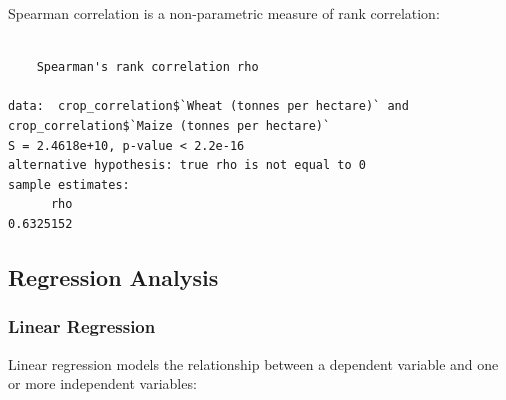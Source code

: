 \documentclass[
  letterpaper,
]{book}
\newenvironment{Shaded}{\begin{snugshade}}{\end{snugshade}}
\newcommand{\AttributeTok}[1]{\textcolor[rgb]{0.40,0.45,0.13}{#1}}
\newcommand{\CommentTok}[1]{\textcolor[rgb]{0.37,0.37,0.37}{#1}}
\newcommand{\FunctionTok}[1]{\textcolor[rgb]{0.28,0.35,0.67}{#1}}
\newcommand{\NormalTok}[1]{\textcolor[rgb]{0.00,0.23,0.31}{#1}}
\newcommand{\OtherTok}[1]{\textcolor[rgb]{0.00,0.23,0.31}{#1}}
\newcommand{\SpecialCharTok}[1]{\textcolor[rgb]{0.37,0.37,0.37}{#1}}
\newcommand{\StringTok}[1]{\textcolor[rgb]{0.13,0.47,0.30}{#1}}
\begin{document}
Spearman correlation is a non-parametric measure of rank correlation:

\begin{Shaded}
\end{Shaded}

\begin{verbatim}

    Spearman's rank correlation rho

data:  crop_correlation$`Wheat (tonnes per hectare)` and crop_correlation$`Maize (tonnes per hectare)`
S = 2.4618e+10, p-value < 2.2e-16
alternative hypothesis: true rho is not equal to 0
sample estimates:
      rho 
0.6325152 
\end{verbatim}

\subsection{Regression Analysis}\label{regression-analysis}

\subsubsection{Linear Regression}\label{linear-regression}

Linear regression models the relationship between a dependent variable
and one or more independent variables:
\end{document}
